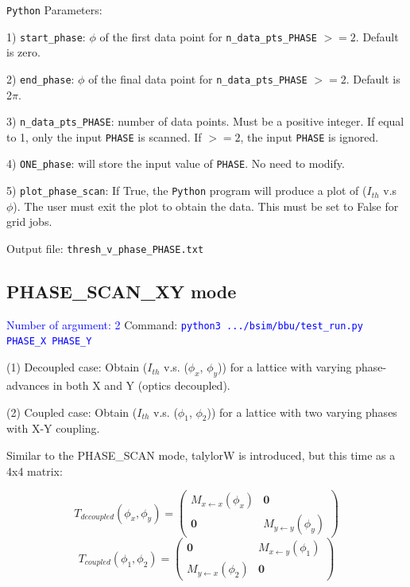 \documentclass{hitec}
\begin{document}
\bigbreak
\texttt{Python} Parameters:

1) \texttt{start_phase}: $\phi$ of the first data point for \texttt{n_data_pts_PHASE} $>=2$. Default is zero.

2) \texttt{end_phase}: $\phi$ of the final data point for \texttt{n_data_pts_PHASE} $>=2$. Default is 2$\pi$.

3) \texttt{n_data_pts_PHASE}: number of data points. Must be a positive integer. If equal to 1, only the input \texttt{PHASE} is scanned. If $>=2$, the input \texttt{PHASE} is ignored.

4) \texttt{ONE_phase}: will store the input value of \texttt{PHASE}.  No need to modify.

5) \texttt{plot_phase_scan}: If True, the \texttt{Python} program will produce a plot of ($I_{th}$ v.s $\phi$). The user must exit the plot to obtain the data. This must be set to False for grid jobs.  

\bigbreak
Output file: \texttt{thresh_v_phase_PHASE.txt}

\subsection{PHASE_SCAN_XY mode}
\textcolor{blue}{Number of argument: 2}
\bigbreak
Command:  \textcolor{blue}{\texttt{python3 .../bsim/bbu/test_run.py  PHASE_X  PHASE_Y }}

\bigbreak
(1) Decoupled case: Obtain ($I_{th}$ v.s. ($\phi_x$, $\phi_y$)) for a lattice with varying phase-advances in both X and Y (optics decoupled).

(2) Coupled case: Obtain ($I_{th}$ v.s. ($\phi_1$, $\phi_2$)) for a lattice with two varying phases with X-Y coupling.

\bigbreak
Similar to the PHASE_SCAN mode, talylorW is introduced, but this time as a 4x4 matrix:

  

\[
T_{decoupled}(\phi_{x},\phi_{y}) =
\begin{pmatrix}
   M_{x\leftarrow x} (\phi_{x}) & \boldsymbol{0}    \\
  \boldsymbol{0}  &  M_{y\leftarrow y} (\phi_{y}) 
\end{pmatrix}
\]
\[
T_{coupled}(\phi_{1},\phi_{2}) =
\begin{pmatrix}
  \boldsymbol{0}   & M_{x\leftarrow y} (\phi_{1})   \\
   M_{y\leftarrow x} (\phi_{2})   & \boldsymbol{0}
\end{pmatrix}
\]
\end{document}
